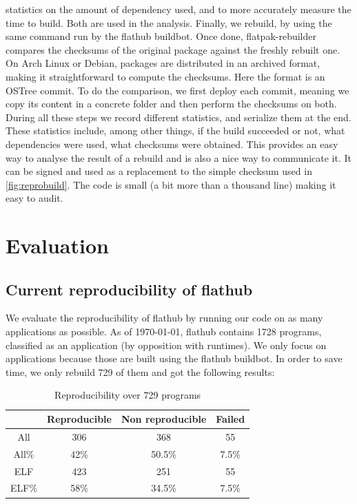 \documentclass[a4paper,11pt,oneside]{report}
\theoremstyle{definition}
\newcommand{\sysname}{flatpak-rebuilder\xspace}
\newcommand{\fh}{flathub\xspace}
\newcommand{\fhbb}{flathub buildbot\xspace}
\begin{document}
statistics on the amount of dependency used, and to more accurately measure the
time to build. Both are used in the analysis. Finally, we rebuild, by using the
same command run by the \fhbb. Once done, \sysname compares the checksums of
the original package against the freshly rebuilt one. On Arch Linux or Debian,
packages are distributed in an archived format, making it straightforward to
compute the checksums. Here the format is an OSTree commit. To do the
comparison, we first deploy each commit, meaning we copy its content in a
concrete folder and then perform the checksums on both. During all these steps
we record different statistics, and serialize them at the end. These statistics
include, among other things, if the build succeeded or not, what dependencies
were used, what checksums were obtained. This provides an easy way to analyse
the result of a rebuild and is also a nice way to communicate it. It can be
signed and used as a replacement to the simple checksum used in
\autoref{fig:reprobuild}. The code is small (a bit more than a thousand line)
making it easy to audit.

\chapter{Evaluation}
\label{chap:eval}

\section{Current reproducibility of \fh}
\label{sec:cr}
We evaluate the reproducibility of \fh by running our code on as many
applications as possible. As of \today, \fh contains 1728 programs, classified
as an application (by opposition with runtimes). We only focus on applications
because those are built using the \fhbb. In order to save time, we only rebuild
729 of them and got the following results:

\begin{table}[h]
    \centering
        \begin{tabular}{|c|c|c|c|}
            \hline
            & Reproducible & Non reproducible & Failed\\
            \hline
            All & 306 & 368 & 55\\
            \hline
            All\% & 42\% & 50.5\% & 7.5\% \\
            \hline
            ELF & 423 & 251 & 55\\
            \hline
            ELF\% & 58\% & 34.5\% & 7.5\% \\
            \hline
        \end{tabular}
    \caption{Reproducibility over 729 programs}
    \label{tab:rebuild-all}
\end{table}
\end{document}
